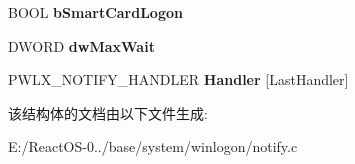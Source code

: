 \begin{DoxyCompactItemize}
B\+O\+OL {\bfseries b\+Smart\+Card\+Logon}
\item 
\mbox{\label{struct___n_o_t_i_f_i_c_a_t_i_o_n___i_t_e_m_a30c2b9ee3bc9ca1e9b5b45527579cbaf}} 
D\+W\+O\+RD {\bfseries dw\+Max\+Wait}
\item 
\mbox{\label{struct___n_o_t_i_f_i_c_a_t_i_o_n___i_t_e_m_a11361ff01e073f383f9b9343e1e492b6}} 
P\+W\+L\+X\+\_\+\+N\+O\+T\+I\+F\+Y\+\_\+\+H\+A\+N\+D\+L\+ER {\bfseries Handler} \mbox{[}Last\+Handler\mbox{]}
\end{DoxyCompactItemize}


该结构体的文档由以下文件生成\+:\begin{DoxyCompactItemize}
\item 
E\+:/\+React\+O\+S-\/0../base/system/winlogon/notify.\+c\end{DoxyCompactItemize}
